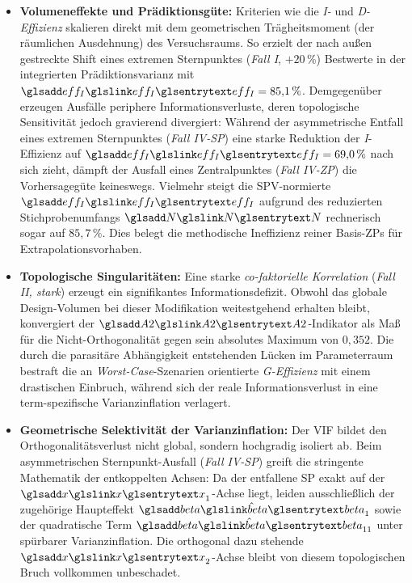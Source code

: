 \begin{itemize}
    \item \textbf{Volumeneffekte und Prädiktionsgüte:} Kriterien wie die \textit{I-} und \textit{D-Effizienz} skalieren direkt mit dem geometrischen Trägheitsmoment (der räumlichen Ausdehnung) des Versuchsraums.
          So erzielt der nach außen gestreckte Shift eines extremen Sternpunktes (\textit{Fall I}, $+20\,\%$) Bestwerte in der integrierten Prädiktionsvarianz mit $\sym{eff_I}=85{,}1\,\%$.
          Demgegenüber erzeugen Ausfälle periphere Informationsverluste, deren topologische Sensitivität jedoch gravierend divergiert: Während der asymmetrische Entfall eines extremen Sternpunktes (\textit{Fall IV-\ac{SP}}) eine starke Reduktion der \textit{I}-Effizienz auf $\sym{eff_I}=69{,}0\,\%$ nach sich zieht, dämpft der Ausfall eines Zentralpunktes (\textit{Fall IV-\ac{ZP}}) die Vorhersagegüte keineswegs.
          Vielmehr steigt die \ac{SPV}-normierte $\sym{eff_I}$ aufgrund des reduzierten Stichprobenumfangs $\sym{N}$ rechnerisch sogar auf $85{,}7\,\%$. Dies belegt die methodische Ineffizienz reiner Basis-\acp{ZP} für Extrapolationsvorhaben.

    \item \textbf{Topologische Singularitäten:} Eine starke \textit{co-faktorielle Korrelation} (\textit{Fall II, stark}) erzeugt ein signifikantes Informationsdefizit.
          Obwohl das globale Design-Volumen bei dieser Modifikation weitestgehend erhalten bleibt, konvergiert der $\sym{A2}$-Indikator als Maß für die Nicht-Orthogonalität gegen sein absolutes Maximum von $0{,}352$.
          Die durch die parasitäre Abhängigkeit entstehenden Lücken im Parameterraum bestraft die an \textit{Worst-Case}-Szenarien orientierte \textit{G-Effizienz} mit einem drastischen Einbruch, während sich der reale Informationsverlust in eine term-spezifische Varianzinflation verlagert.

    \item \textbf{Geometrische Selektivität der Varianzinflation:} Der \ac{VIF} bildet den Orthogonalitätsverlust nicht global, sondern hochgradig isoliert ab.
          Beim asymmetrischen Sternpunkt-Ausfall (\textit{Fall IV-\ac{SP}}) greift die stringente Mathematik der entkoppelten Achsen: Da der entfallene \ac{SP} exakt auf der $\sym{x}_1$-Achse liegt, leiden ausschließlich der zugehörige Haupteffekt $\hat{\sym{beta}}_1$ sowie der quadratische Term $\hat{\sym{beta}}_{11}$ unter spürbarer Varianzinflation.
          Die orthogonal dazu stehende $\sym{x}_2$-Achse bleibt von diesem topologischen Bruch vollkommen unbeschadet.
\end{itemize}

